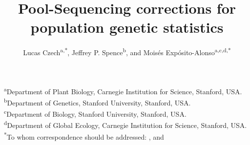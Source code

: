 \documentclass[a4paper,fontsize=9pt,DIV=14]{scrartcl}
\title{Pool-Sequencing corrections for population genetic statistics}
\author{\orcid{0000-0002-1340-9644}Lucas Czech\textsuperscript{a,*}, \orcid{0000-0002-3199-1447}Jeffrey P. Spence\textsuperscript{b}, and \orcid{0000-0001-5711-0700}Moisés Expósito-Alonso\textsuperscript{a,c,d,*}}
\date{}
\newcommand{\beginsupplement}{%
    \setcounter{table}{0}
    \renewcommand{\thetable}{\arabic{table}}%
    \setcounter{figure}{0}
    \renewcommand{\thefigure}{\arabic{figure}}%
}
\begin{document}


\begingroup
\let\center\flushleft
\let\endcenter\endflushleft
\maketitle
\endgroup
\vspace*{-3.5em}
\textsuperscript{a}{Department of Plant Biology, Carnegie Institution for Science, Stanford, USA.\\}
\textsuperscript{b}{Department of Genetics, Stanford University, Stanford, USA.\\}
\textsuperscript{c}{Department of Biology, Stanford University, Stanford, USA.\\}
\textsuperscript{d}{Department of Global Ecology, Carnegie Institution for Science, Stanford, USA.\\}
\textsuperscript{*}{To whom correspondence should be addressed: \href{mailto:lczech@carnegiescience.edu}{\color{black}{lczech@carnegiescience.edu}},
and \href{mailto:moisesexpositoalonso@gmail.com}{\color{black}{moisesexpositoalonso@gmail.com}}}




\vspace*{2em}
\setlength{\fboxsep}{2em}
\vspace*{2em}
\end{document}
